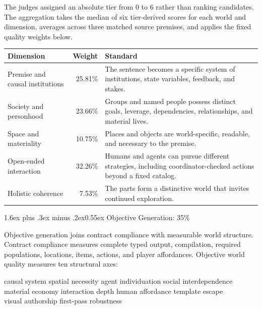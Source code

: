 \documentclass[11pt,a4paper]{article}
\makeatletter
\renewcommand\subsection{\@startsection{subsection}{2}{0pt}%
  {1.6ex plus .3ex minus .2ex}{0.55ex}%
  {\color{AgoraTeal}\sffamily\large\bfseries}}
\makeatother
\begin{document}
The judges assigned an absolute tier from 0 to 6 rather than ranking candidates. The aggregation
takes the median of six tier-derived scores for each world and dimension, averages across three
matched source premises, and applies the fixed quality weights below.

\begin{table}[htbp]
\centering
\small
\begin{tabularx}{\textwidth}{@{}L r L@{}}
\toprule
\textbf{Dimension} & \textbf{Weight} & \textbf{Standard} \\
\midrule
Premise and causal institutions & 25.81\% & The sentence becomes a specific system of institutions, state variables, feedback, and stakes. \\
Society and personhood & 23.66\% & Groups and named people possess distinct goals, leverage, dependencies, relationships, and material lives. \\
Space and materiality & 10.75\% & Places and objects are world-specific, readable, and necessary to the premise. \\
Open-ended interaction & 32.26\% & Humans and agents can pursue different strategies, including coordinator-checked actions beyond a fixed catalog. \\
Holistic coherence & 7.53\% & The parts form a distinctive world that invites continued exploration. \\
\bottomrule
\end{tabularx}
\end{table}

\subsection{Objective Generation: 35\%}

Objective generation joins contract compliance with measurable world structure. Contract compliance
measures complete typed output, compilation, required populations, locations, items, actions, and
player affordances. Objective world quality measures ten structural axes:

\begin{center}
\small\sffamily\color{AgoraInk}
causal system \quad spatial necessity \quad agent individuation \quad social interdependence\\
material economy \quad interaction depth \quad human affordance \quad template escape\\
visual authorship \quad first-pass robustness
\end{center}
\end{document}
